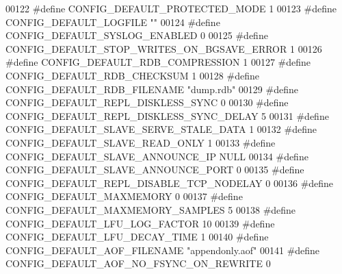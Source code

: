 \begin{DoxyCode}
00122 \textcolor{preprocessor}{#}\textcolor{preprocessor}{define} \textcolor{preprocessor}{CONFIG\_DEFAULT\_PROTECTED\_MODE} 1
00123 \textcolor{preprocessor}{#}\textcolor{preprocessor}{define} \textcolor{preprocessor}{CONFIG\_DEFAULT\_LOGFILE} \textcolor{stringliteral}{""}
00124 \textcolor{preprocessor}{#}\textcolor{preprocessor}{define} \textcolor{preprocessor}{CONFIG\_DEFAULT\_SYSLOG\_ENABLED} 0
00125 \textcolor{preprocessor}{#}\textcolor{preprocessor}{define} \textcolor{preprocessor}{CONFIG\_DEFAULT\_STOP\_WRITES\_ON\_BGSAVE\_ERROR} 1
00126 \textcolor{preprocessor}{#}\textcolor{preprocessor}{define} \textcolor{preprocessor}{CONFIG\_DEFAULT\_RDB\_COMPRESSION} 1
00127 \textcolor{preprocessor}{#}\textcolor{preprocessor}{define} \textcolor{preprocessor}{CONFIG\_DEFAULT\_RDB\_CHECKSUM} 1
00128 \textcolor{preprocessor}{#}\textcolor{preprocessor}{define} \textcolor{preprocessor}{CONFIG\_DEFAULT\_RDB\_FILENAME} \textcolor{stringliteral}{"dump.rdb"}
00129 \textcolor{preprocessor}{#}\textcolor{preprocessor}{define} \textcolor{preprocessor}{CONFIG\_DEFAULT\_REPL\_DISKLESS\_SYNC} 0
00130 \textcolor{preprocessor}{#}\textcolor{preprocessor}{define} \textcolor{preprocessor}{CONFIG\_DEFAULT\_REPL\_DISKLESS\_SYNC\_DELAY} 5
00131 \textcolor{preprocessor}{#}\textcolor{preprocessor}{define} \textcolor{preprocessor}{CONFIG\_DEFAULT\_SLAVE\_SERVE\_STALE\_DATA} 1
00132 \textcolor{preprocessor}{#}\textcolor{preprocessor}{define} \textcolor{preprocessor}{CONFIG\_DEFAULT\_SLAVE\_READ\_ONLY} 1
00133 \textcolor{preprocessor}{#}\textcolor{preprocessor}{define} \textcolor{preprocessor}{CONFIG\_DEFAULT\_SLAVE\_ANNOUNCE\_IP} NULL
00134 \textcolor{preprocessor}{#}\textcolor{preprocessor}{define} \textcolor{preprocessor}{CONFIG\_DEFAULT\_SLAVE\_ANNOUNCE\_PORT} 0
00135 \textcolor{preprocessor}{#}\textcolor{preprocessor}{define} \textcolor{preprocessor}{CONFIG\_DEFAULT\_REPL\_DISABLE\_TCP\_NODELAY} 0
00136 \textcolor{preprocessor}{#}\textcolor{preprocessor}{define} \textcolor{preprocessor}{CONFIG\_DEFAULT\_MAXMEMORY} 0
00137 \textcolor{preprocessor}{#}\textcolor{preprocessor}{define} \textcolor{preprocessor}{CONFIG\_DEFAULT\_MAXMEMORY\_SAMPLES} 5
00138 \textcolor{preprocessor}{#}\textcolor{preprocessor}{define} \textcolor{preprocessor}{CONFIG\_DEFAULT\_LFU\_LOG\_FACTOR} 10
00139 \textcolor{preprocessor}{#}\textcolor{preprocessor}{define} \textcolor{preprocessor}{CONFIG\_DEFAULT\_LFU\_DECAY\_TIME} 1
00140 \textcolor{preprocessor}{#}\textcolor{preprocessor}{define} \textcolor{preprocessor}{CONFIG\_DEFAULT\_AOF\_FILENAME} \textcolor{stringliteral}{"appendonly.aof"}
00141 \textcolor{preprocessor}{#}\textcolor{preprocessor}{define} \textcolor{preprocessor}{CONFIG\_DEFAULT\_AOF\_NO\_FSYNC\_ON\_REWRITE} 0

\end{DoxyCode}
